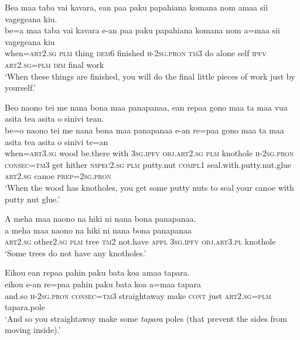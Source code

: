 \ea\label{ex:text18-38}
Bea maa taba vai kavara, ean paa paku papahiana komana nom amaa sii vagegeana kiu.\\
\gll be=a	maa	taba	vai	kavara	e-an	paa	paku	papahiana	komana	nom	a=maa	sii	vagegeana	kiu\\
     when=\textsc{art}2.\textsc{sg}	\textsc{plm}	thing	\textsc{dem}6	finished	\textsc{h}-2\textsc{sg}.\textsc{pron}	\textsc{tm}3	do	alone	self	\textsc{ipfv}	\textsc{art}2.\textsc{sg}=\textsc{plm}	\textsc{dim}	final	work\\
\glt `When these things are finished, you will do the final little pieces of work just by yourself.'
\z

\ea\label{ex:text18-39}
Beo naono tei me nana bona maa panapanaa, ean repaa gono maa ta maa vua asita tea asita o sinivi tean.\\
\gll be=o	naono	tei	me	nana	bona	maa	panapanaa	e-an	re=paa	gono	maa	ta	maa	asita	tea	asita	o	sinivi	te=an\\
     when=\textsc{art}3.\textsc{sg}	wood	be.there	with	3\textsc{sg}.\textsc{ipfv}	\textsc{obj}.\textsc{art}2.\textsc{sg}	\textsc{plm}	knothole	\textsc{h}-2\textsc{sg}.\textsc{pron}	\textsc{consec}=\textsc{tm}3	get	hither	\textsc{nspec}2.\textsc{sg}	\textsc{plm}	putty.nut	\textsc{compl}1	seal.with.putty.nut.glue	\textsc{art}2.\textsc{sg}	canoe	\textsc{prep}=2\textsc{sg}.\textsc{pron}\\
\glt `When the wood has knotholes, you get some putty nuts to seal your canoe with putty nut glue.'
\z

\ea\label{ex:text18-40}
A meha maa naono na hiki ni nana bona panapanaa.\\
\gll a	meha	maa	naono	na	hiki	ni	nana	bona	panapanaa\\
     \textsc{art}2.\textsc{sg}	other2.\textsc{sg}	\textsc{plm}	tree	\textsc{tm}2	not.have	\textsc{appl}	3\textsc{sg}.\textsc{ipfv}	\textsc{obj}.\textsc{art}3.\textsc{pl}	knothole\\
\glt `Some trees do not have any knotholes.'
\z

\newpage
\ea\label{ex:text18-41}
Eikou ean repaa pahin paku bata koa amaa tapara.\\
\gll eikou	e-an	re=paa	pahin	paku	bata	koa	a=maa	tapara\\
     and.so	\textsc{h}-2\textsc{sg}.\textsc{pron}	\textsc{consec}=\textsc{tm}3	straightaway	make	\textsc{cont}	just	\textsc{art}2.\textsc{sg}=\textsc{plm}	tapara.pole\\
\glt `And so you straightaway make some \textit{tapara} poles (that prevent the sides from moving inside).'
\z

